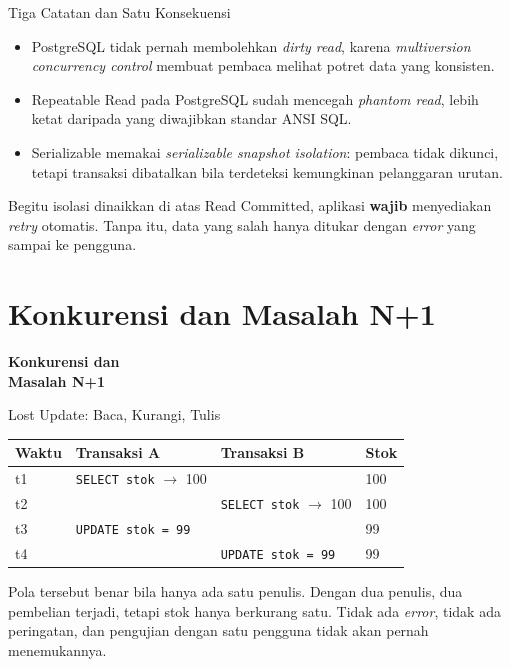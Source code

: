 \documentclass[aspectratio=169, table, 12pt]{beamer}
\begin{document}
\begin{frame}{{\Large Tiga Catatan dan Satu Konsekuensi}}
  \vspace{8pt}
  \begin{itemize}
    \item PostgreSQL tidak pernah membolehkan \textit{dirty read}, karena
          \textit{multiversion concurrency control} membuat pembaca melihat
          potret data yang konsisten.
    \item Repeatable Read pada PostgreSQL sudah mencegah \textit{phantom
          read}, lebih ketat daripada yang diwajibkan standar ANSI SQL.
    \item Serializable memakai \textit{serializable snapshot isolation}:
          pembaca tidak dikunci, tetapi transaksi dibatalkan bila terdeteksi
          kemungkinan pelanggaran urutan.
  \end{itemize}
  \vspace{6pt}
  {\footnotesize Begitu isolasi dinaikkan di atas Read Committed, aplikasi
  \textbf{wajib} menyediakan \textit{retry} otomatis. Tanpa itu, data yang salah
  hanya ditukar dengan \textit{error} yang sampai ke pengguna.}
\end{frame}

\section{Konkurensi dan Masalah N+1}

\begin{frame}{\hfill}
  \centering
  \Huge{\textbf{Konkurensi dan\\Masalah N+1}}
\end{frame}

\begin{frame}{{\Large Lost Update: Baca, Kurangi, Tulis}}
  \vspace{5pt}
  {\centering
  {\small
  \begin{tabularx}{\textwidth}{lXXl}
    \hline
    \textbf{Waktu} & \textbf{Transaksi A} & \textbf{Transaksi B} & \textbf{Stok} \\
    \hline
    t1 & \texttt{SELECT stok} $\rightarrow$ 100 & & 100 \\
    \hline
    t2 & & \texttt{SELECT stok} $\rightarrow$ 100 & 100 \\
    \hline
    t3 & \texttt{UPDATE stok = 99} & & 99 \\
    \hline
    t4 & & \texttt{UPDATE stok = 99} & 99 \\
    \hline
  \end{tabularx}}\par}

  \vspace{10pt}
  {\footnotesize Pola tersebut benar bila hanya ada satu penulis. Dengan dua
  penulis, dua pembelian terjadi, tetapi stok hanya berkurang satu. Tidak ada
  \textit{error}, tidak ada peringatan, dan pengujian dengan satu pengguna tidak akan
  pernah menemukannya.}
\end{frame}
\end{document}

